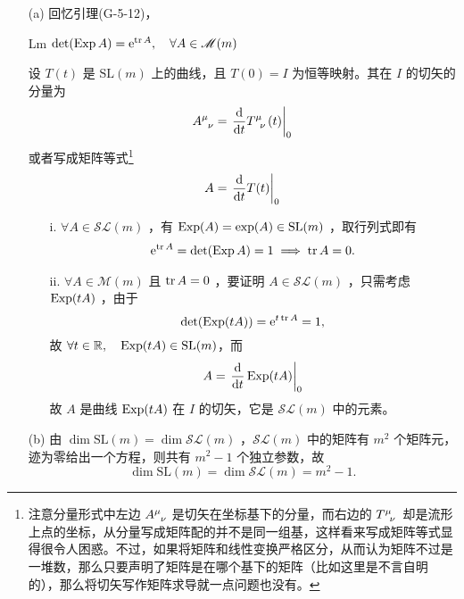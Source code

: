 \begin{xiti}
    \begin{zm}
    	\begin{enumerate}
    		\item[(a)] 回忆引理(G-5-12)，
    		\begin{yl}{Lm}
    			$\det(\Exp A)=\e{\tr A}\qc \forall A\in \mathscr{M}(m)$
    		\end{yl}
    	    设 $T(t)$ 是 $\mathrm{SL}(m)$ 上的曲线，且 $T(0)=I$ 为恒等映射。其在 $I$ 的切矢的分量为
    	    \begin{displaymath}
    	    \tensor{A}{^\mu_\nu} = \left. \dv{t} \tensor{T}{^\mu_\nu}(t) \right|_0
    	    \end{displaymath}
    	    或者写成矩阵等式\footnote{注意分量形式中左边 $\tensor{A}{^\mu_\nu}$ 是切矢在坐标基下的分量，而右边的 $\tensor{T}{^\mu_\nu}$ 却是流形上点的坐标，从分量写成矩阵配的并不是同一组基，这样看来写成矩阵等式显得很令人困惑。不过，如果将矩阵和线性变换严格区分，从而认为矩阵不过是一堆数，那么只要声明了矩阵是在哪个基下的矩阵（比如这里是不言自明的），那么将切矢写作矩阵求导就一点问题也没有。}
    	    \begin{displaymath}
    	    A=\left. \dv{t} T(t) \right|_0
    	    \end{displaymath}
    	    \begin{enumerate}[leftmargin=2em]
    	    	\item[i.] $\forall A\in \mathscr{S\!\!L}(m)$ ，有 $\operatorname{Exp}(A) = \exp(A) \in \mathrm{SL}(m)$ ，取行列式即有
    	    	\begin{align*}
    	    	\mathrm{e}^{\tr A} = \det(\operatorname{Exp} A) = 1 \implies \tr A=0.
    	    	\end{align*}
    	    	\item[ii.] $\forall A\in \mathscr{M}(m)$ 且 $\tr A=0$ ，要证明 $A\in \mathscr{S\!\!L}(m)$ ，只需考虑 $\operatorname{Exp}(tA)$ ，由于
    	    	\begin{displaymath}
    	    	\det(\operatorname{Exp}(tA)) = \mathrm{e}^{t\tr A} = 1,
    	    	\end{displaymath}
    	    	故 $\forall t\in \mathbb{R}\qc \Exp(tA) \in \mathrm{SL}(m)$，而
    	    	\begin{displaymath}
    	    	A=\left. \dv{t} \operatorname{Exp}(tA) \right|_0
    	    	\end{displaymath}
    	    	故 $A$ 是曲线 $\operatorname{Exp}(tA)$ 在 $I$ 的切矢，它是 $\mathscr{S\!\!L}(m)$ 中的元素。
    	    \end{enumerate}
            \item[(b)] 由 $\dim \mathrm{SL}(m) = \dim \mathscr{S\!\!L}(m)$ ，$\mathscr{S\!\!L}(m)$ 中的矩阵有 $m^2$ 个矩阵元，迹为零给出一个方程，则共有 $m^2-1$ 个独立参数，故 \[\dim \mathrm{SL}(m) = \dim \mathscr{S\!\!L}(m)=m^2-1.\]
    	\end{enumerate}
    \end{zm}


\end{xiti}
